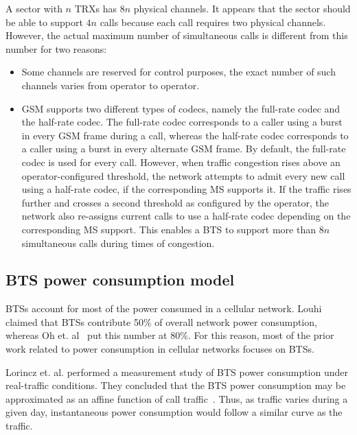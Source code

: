 A sector with $n$ TRXs has $8n$ physical channels. It appears that the sector should be able to support $4n$ calls because each call requires two physical channels. However, the actual maximum number of simultaneous calls is different from this number for two reasons: 
\begin{itemize}
\item Some channels are reserved for control purposes, the exact number of such channels varies from operator to operator.
\item GSM supports two different types of codecs, namely the full-rate codec and the half-rate codec. The full-rate codec corresponds to a caller using a burst in every GSM frame during a call, whereas the half-rate codec corresponds to a caller using a burst in every alternate GSM frame. By default, the full-rate codec is used for every call. However, when traffic congestion rises above an operator-configured threshold, the network attempts to admit every new call using a half-rate codec, if the corresponding MS supports it. If the traffic rises further and crosses a second threshold as configured by the operator, the network also re-assigns current calls to use a half-rate codec depending on the corresponding MS support. This enables a BTS to support more than $8n$ simultaneous calls during times of congestion.
\end{itemize}
 

\subsection{BTS power consumption model} %
BTSs account for most of the power consumed in a cellular network. Louhi~\cite{Louhi:2007:BTSPower:INTELEC} claimed that BTSs contribute 50\% of overall network power consumption, whereas Oh et. al~\cite{Oh:Comm:2011} put this number at 80\%. For this reason, most of the prior work related to power consumption in cellular networks focuses on BTSs. 

Lorincz et. al. performed a measurement study of BTS power consumption under real-traffic conditions. They concluded that the BTS power consumption may be approximated as an affine function of call traffic~\cite{Lorincz:BTS-Measure:Sensors:2012}. Thus, as traffic varies during a given day, instantaneous power consumption would follow a similar curve as the traffic. 

